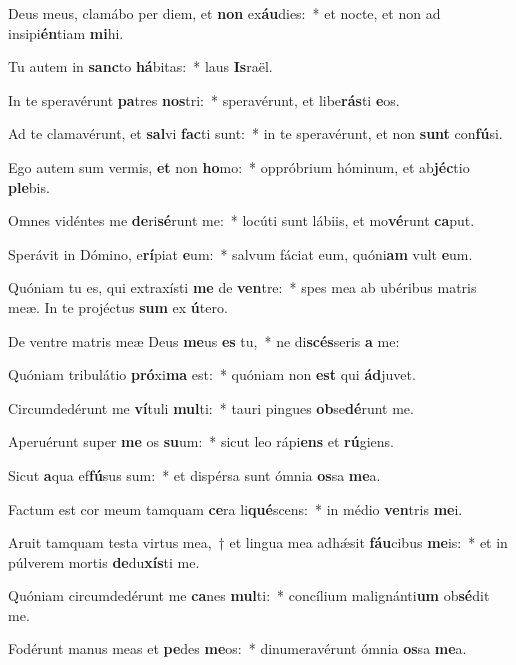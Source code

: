 \item Deus meus, clamábo per diem, et \textbf{non} ex\textbf{áu}dies:~* et nocte, et non ad insipi\textbf{én}tiam \textbf{mi}hi.
\item Tu autem in \textbf{sanc}to \textbf{há}bitas:~* laus \textbf{Is}raël.
\item In te speravérunt \textbf{pa}tres \textbf{nos}tri:~* speravérunt, et libe\textbf{rás}ti \textbf{e}os.
\item Ad te clamavérunt, et \textbf{sal}vi \textbf{fac}ti sunt:~* in te speravérunt, et non \textbf{sunt} con\textbf{fú}si.
\item Ego autem sum vermis, \textbf{et} non \textbf{ho}mo:~* oppróbrium hóminum, et ab\textbf{jéc}tio \textbf{ple}bis.
\item Omnes vidéntes me \textbf{de}ri\textbf{sé}runt me:~* locúti sunt lábiis, et mo\textbf{vé}runt \textbf{ca}put.
\item Sperávit in Dómino, e\textbf{rí}piat \textbf{e}um:~* salvum fáciat eum, quóni\textbf{am} vult \textbf{e}um.
\item Quóniam tu es, qui extraxísti \textbf{me} de \textbf{ven}tre:~* spes mea ab ubéribus matris meæ. In te projéctus \textbf{sum} ex \textbf{ú}tero.
\item De ventre matris meæ Deus \textbf{me}us \textbf{es} tu,~* ne di\textbf{scés}seris \textbf{a} me:
\item Quóniam tribulátio \textbf{pró}xi\textbf{ma} est:~* quóniam non \textbf{est} qui \textbf{ád}juvet.
\item Circumdedérunt me \textbf{ví}tuli \textbf{mul}ti:~* tauri pingues \textbf{ob}se\textbf{dé}runt me.
\item Aperuérunt super \textbf{me} os \textbf{su}um:~* sicut leo rápi\textbf{ens} et \textbf{rú}giens.
\item Sicut \textbf{a}qua ef\textbf{fú}sus sum:~* et dispérsa sunt ómnia \textbf{os}sa \textbf{me}a.
\item Factum est cor meum tamquam \textbf{ce}ra li\textbf{qué}scens:~* in médio \textbf{ven}tris \textbf{me}i.
\item Aruit tamquam testa virtus mea,~† et lingua mea adhǽsit \textbf{fáu}cibus \textbf{me}is:~* et in púlverem mortis \textbf{de}du\textbf{xís}ti me.
\item Quóniam circumdedérunt me \textbf{ca}nes \textbf{mul}ti:~* concílium malignánti\textbf{um} ob\textbf{sé}dit me.
\item Fodérunt manus meas et \textbf{pe}des \textbf{me}os:~* dinumeravérunt ómnia \textbf{os}sa \textbf{me}a.
